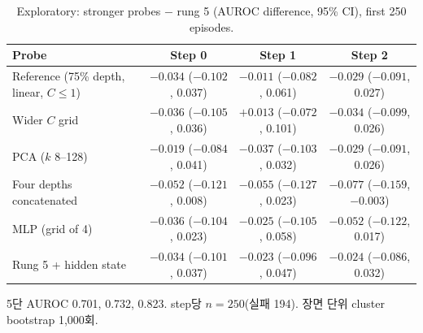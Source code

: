 \begin{table}[htbp]
\centering\small
\caption{Exploratory: stronger probes $-$ rung 5 (AUROC difference, 95\% CI), first 250 episodes.}\label{tab:strength}
\begin{tabularx}{\linewidth}{@{}Lccc@{}}
\toprule
Probe & Step 0 & Step 1 & Step 2 \\
\midrule
Reference (75\% depth, linear, $C \le 1$) & $-0.034$ ($-0.102$, 0.037) & $-0.011$ ($-0.082$, 0.061) & $-0.029$ ($-0.091$, 0.027) \\
Wider $C$ grid & $-0.036$ ($-0.105$, 0.036) & $+0.013$ ($-0.072$, 0.101) & $-0.034$ ($-0.099$, 0.026) \\
PCA ($k$ 8--128) & $-0.019$ ($-0.084$, 0.041) & $-0.037$ ($-0.103$, 0.032) & $-0.029$ ($-0.091$, 0.026) \\
Four depths concatenated & $-0.052$ ($-0.121$, 0.008) & $-0.055$ ($-0.127$, 0.023) & $-0.077$ ($-0.159$, $-0.003$) \\
MLP (grid of 4) & $-0.036$ ($-0.104$, 0.023) & $-0.025$ ($-0.105$, 0.058) & $-0.052$ ($-0.122$, 0.017) \\
Rung 5 + hidden state & $-0.034$ ($-0.101$, 0.037) & $-0.023$ ($-0.096$, 0.047) & $-0.024$ ($-0.086$, 0.032) \\
\bottomrule
\end{tabularx}
\par\smallskip\raggedright\footnotesize
5단 AUROC 0.701, 0.732, 0.823. step당 $n = 250$(실패 194). 장면 단위 cluster bootstrap 1,000회.
\end{table}
